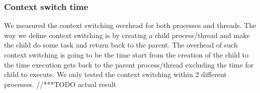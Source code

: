 \subsubsection{Context switch time}
We measured the context switching overhead for both processes and threads. The way we define context switching is by creating a child process/thread and make the child do some task and return back to the parent. The overhead of such context switching is going to be the time start from the creation of the child to the time execution gets back to the parent process/thread excluding the time for child to execute. We only tested the context switching within 2 different processes.
//***TODO actual result

